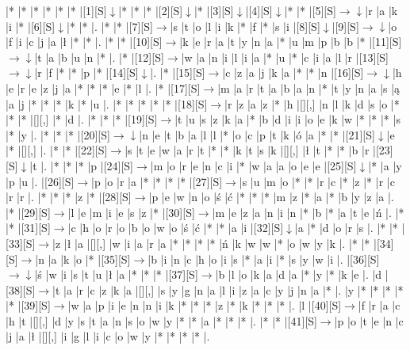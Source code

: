 \documentclass[11pt]{article}
\newcommand\drarr{$\rightarrow \!\!\!\!\! \downarrow$}
\newcommand\rarr{$\rightarrow$}
\newcommand\darr{$\downarrow$}
\begin{document}
\noindent\begin{Puzzle}{24}{21}|*	|*	|*	|*	|*	|*	|[1][S]\darr	|*	|*	|*	|[2][S]\darr	|*	|[3][S]\darr	|[4][S]\darr	|*	|*	|[5][S]\drarr	|r	|a	|k	|i	|*	|[6][S]\darr	|*	|*	|.
|*	|*	|[7][S]\rarr	|s	|t	|o	|l	|i	|k	|*	|f	|*	|s	|i	|[8][S]\darr	|[9][S]\drarr	|o	|f	|i	|c	|j	|a	|ł	|*	|*	|.
|*	|*	|[10][S]\rarr	|k	|e	|r	|a	|t	|y	|n	|a	|*	|u	|m	|p	|b	|b	|*	|[11][S]\drarr	|t	|a	|b	|u	|n	|*	|.
|*	|[12][S]\rarr	|w	|a	|n	|i	|l	|i	|a	|*	|u	|*	|c	|i	|a	|l	|r	|[13][S]\drarr	|r	|f	|*	|*	|p	|*	|[14][S]\darr	|.
|*	|[15][S]\rarr	|c	|z	|a	|j	|k	|a	|*	|*	|n	|[16][S]\drarr	|h	|e	|r	|e	|z	|j	|a	|*	|*	|*	|e	|*	|l	|.
|*	|[17][S]\rarr	|m	|a	|r	|t	|a	|b	|a	|n	|*	|t	|y	|n	|a	|s	|ą	|a	|j	|*	|*	|*	|k	|*	|u	|.
|*	|*	|*	|*	|*	|[18][S]\rarr	|r	|z	|a	|z	|*	|h	|[][,]{ }	|n	|l	|k	|d	|s	|o	|*	|*	|*	|[][,]{ }	|*	|d	|.
|*	|*	|*	|[19][S]\rarr	|t	|u	|s	|z	|k	|a	|*	|b	|d	|i	|i	|o	|e	|k	|w	|*	|*	|*	|s	|*	|y	|.
|*	|*	|*	|[20][S]\drarr	|n	|e	|t	|b	|a	|l	|l	|*	|o	|c	|p	|t	|k	|ó	|a	|*	|*	|[21][S]\darr	|e	|*	|[][,]{ }	|.
|*	|*	|[22][S]\rarr	|s	|t	|e	|w	|a	|r	|t	|*	|*	|k	|t	|s	|k	|[][,]{ }	|ł	|t	|*	|*	|b	|r	|[23][S]\darr	|t	|.
|*	|*	|*	|p	|[24][S]\rarr	|m	|o	|r	|e	|n	|c	|i	|*	|w	|a	|a	|o	|e	|e	|[25][S]\darr	|*	|a	|y	|p	|u	|.
|[26][S]\rarr	|p	|o	|r	|a	|*	|*	|*	|*	|[27][S]\rarr	|s	|u	|m	|o	|*	|*	|r	|c	|*	|z	|*	|r	|c	|r	|r	|.
|*	|*	|*	|z	|*	|[28][S]\rarr	|p	|e	|w	|n	|o	|ś	|ć	|*	|*	|*	|m	|z	|*	|a	|*	|b	|y	|z	|a	|.
|*	|[29][S]\rarr	|l	|e	|m	|i	|e	|s	|z	|*	|[30][S]\rarr	|m	|e	|z	|a	|n	|i	|n	|*	|b	|*	|a	|t	|e	|ń	|.
|*	|*	|[31][S]\rarr	|c	|h	|o	|r	|o	|b	|o	|w	|o	|ś	|ć	|*	|*	|a	|i	|[32][S]\darr	|a	|*	|d	|o	|r	|s	|.
|*	|*	|[33][S]\rarr	|z	|ł	|a	|[][,]{ }	|w	|i	|a	|r	|a	|*	|*	|*	|*	|ń	|k	|w	|w	|*	|o	|w	|y	|k	|.
|*	|*	|[34][S]\rarr	|n	|a	|k	|o	|*	|[35][S]\rarr	|b	|i	|n	|c	|h	|o	|i	|s	|*	|a	|i	|*	|s	|y	|w	|i	|.
|[36][S]\drarr	|ś	|w	|i	|s	|t	|u	|ł	|a	|*	|*	|*	|[37][S]\rarr	|b	|l	|o	|k	|a	|d	|a	|*	|y	|*	|k	|e	|.
|d	|[38][S]\rarr	|t	|a	|r	|c	|z	|k	|a	|[][,]{ }	|s	|y	|g	|n	|a	|l	|i	|z	|a	|c	|y	|j	|n	|a	|*	|.
|y	|*	|*	|*	|*	|*	|[39][S]\rarr	|w	|a	|p	|i	|e	|n	|n	|i	|k	|*	|*	|*	|z	|*	|k	|*	|*	|*	|.
|l	|[40][S]\rarr	|f	|r	|a	|c	|h	|t	|[][,]{ }	|d	|y	|s	|t	|a	|n	|s	|o	|w	|y	|*	|*	|a	|*	|*	|*	|.
|*	|*	|[41][S]\rarr	|p	|o	|t	|e	|n	|c	|j	|a	|ł	|[][,]{ }	|i	|g	|l	|i	|c	|o	|w	|y	|*	|*	|*	|*	|.\end{Puzzle}

\newpage
\end{document}
